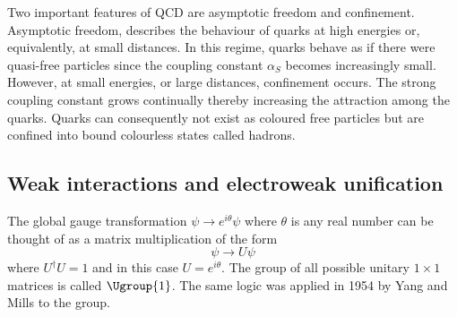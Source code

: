 Two important features of QCD are asymptotic freedom and confinement. Asymptotic freedom, describes the behaviour of quarks at high energies or, equivalently, at small distances. In this regime, quarks
behave as if there were quasi-free particles since the coupling constant $\alpha_S$ becomes increasingly
small. However, at small energies, or large distances, confinement occurs. The strong coupling constant grows continually thereby increasing the attraction among the quarks. Quarks can consequently not exist as coloured free particles but are confined into bound colourless states called hadrons.

\subsection{Weak interactions and electroweak unification}


The global gauge transformation $\psi\rightarrow e^{i\theta}\psi$ where $\theta$ is any real number can be thought of as a matrix multiplication of the form
\begin{equation}
    \psi\rightarrow U\psi
\end{equation}
where $U^{\dag}U=1$ and in this case $U=e^{i\theta}$. The group of all possible unitary $1\times1$ matrices is called $\Ugroup{1}$. The same logic was applied in 1954 by Yang and Mills to the  group.


